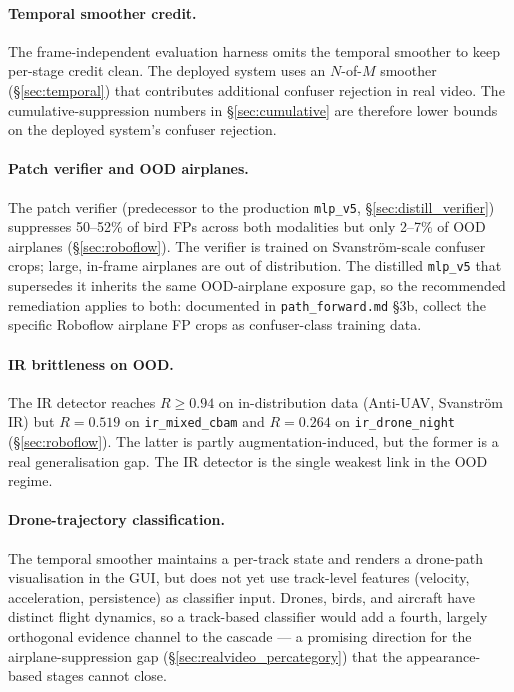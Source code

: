 \documentclass[12pt,a4paper,oneside,openright]{book}
\begin{document}
\paragraph{Temporal smoother credit.}
The frame-independent evaluation harness omits the temporal smoother to keep per-stage credit clean. The deployed system uses an $N$-of-$M$ smoother (\S\ref{sec:temporal}) that contributes additional confuser rejection in real video. The cumulative-suppression numbers in \S\ref{sec:cumulative} are therefore lower bounds on the deployed system's confuser rejection.

\paragraph{Patch verifier and OOD airplanes.}
The patch verifier (predecessor to the production \texttt{mlp\_v5}, \S\ref{sec:distill_verifier}) suppresses 50--52\% of bird FPs across both modalities but only 2--7\% of OOD airplanes (\S\ref{sec:roboflow}). The verifier is trained on Svanstr\"om-scale confuser crops; large, in-frame airplanes are out of distribution. The distilled \texttt{mlp\_v5} that supersedes it inherits the same OOD-airplane exposure gap, so the recommended remediation applies to both: documented in \texttt{path\_forward.md} \S3b, collect the specific Roboflow airplane FP crops as confuser-class training data.

\paragraph{IR brittleness on OOD.}
The IR detector reaches $R \geq 0.94$ on in-distribution data (Anti-UAV, Svanstr\"om IR) but $R=0.519$ on \texttt{ir\_mixed\_cbam} and $R=0.264$ on \texttt{ir\_drone\_night} (\S\ref{sec:roboflow}). The latter is partly augmentation-induced, but the former is a real generalisation gap. The IR detector is the single weakest link in the OOD regime.

\paragraph{Drone-trajectory classification.}
The temporal smoother maintains a per-track state and renders a drone-path visualisation in the GUI, but does not yet use track-level features (velocity, acceleration, persistence) as classifier input. Drones, birds, and aircraft have distinct flight dynamics, so a track-based classifier would add a fourth, largely orthogonal evidence channel to the cascade --- a promising direction for the airplane-suppression gap (\S\ref{sec:realvideo_percategory}) that the appearance-based stages cannot close.
\end{document}
